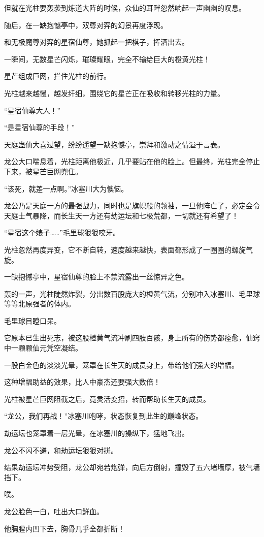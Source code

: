 \begin{this_body}
但就在光柱要轰袭到炼道大阵的时候，众仙的耳畔忽然响起一声幽幽的叹息。

随后，在一缺抱憾亭中，双尊对弈的幻景再度浮现。

和无极魔尊对弈的星宿仙尊，她抓起一把棋子，挥洒出去。

一瞬间，无数星芒闪烁，璀璨耀眼，完全不输给巨大的橙黄光柱！

星芒组成巨网，拦住光柱的前行。

光柱越来越慢，越发纤细，围绕它的星芒正在吸收和转移光柱的力量。

“星宿仙尊大人！”

“是星宿仙尊的手段！”

天庭蛊仙大喜过望，纷纷遥望一缺抱憾亭，崇拜和激动之情溢于言表。

龙公大口喘息着，光柱距离他极近，几乎要贴在他的脸上。但最终，光柱完全停止下来，被星芒巨网兜住。

“该死，就差一点啊。”冰塞川大为懊恼。

龙公乃是天庭一方的最强战力，同时也是旗帜般的领袖，一旦他阵亡了，必定会令天庭士气暴降，而长生天一方还有劫运坛和七极荒都，一切就还有希望了！

“星宿这个婊子……”毛里球狠狠咬牙。

光柱忽然再度异变，它不断自转，速度越来越快，表面都形成了一圈圈的螺旋气旋。

一缺抱憾亭中，星宿仙尊的脸上不禁流露出一丝惊异之色。

轰的一声，光柱陡然炸裂，分出数百股庞大的橙黄气流，分别冲入冰塞川、毛里球等等北原强者的体内。

毛里球目瞪口呆。

它原本已生出死志，被这股橙黄气流冲刷四肢百骸，身上所有的伤势都痊愈，仙窍中一颗颗仙元凭空凝结。

一股白金色的淡淡光晕，笼罩在长生天的成员身上，带给他们强大的增幅。

这种增幅助益的效果，比人中豪杰还要强大数倍！

光柱被星芒巨网阻截之后，竟灵活变招，转而帮助长生天的成员。

“龙公，我们再战！”冰塞川咆哮，状态恢复到此生的巅峰状态。

劫运坛也笼罩着一层光晕，在冰塞川的操纵下，猛地飞出。

龙公不闪不避，和劫运坛狠狠对拼。

结果劫运坛冲势受阻，龙公却宛若炮弹，向后方倒射，撞毁了五六堵墙厚，被气墙挡下。

噗。

龙公脸色一白，吐出大口鲜血。

他胸膛内凹下去，胸骨几乎全都折断！

\end{this_body}

